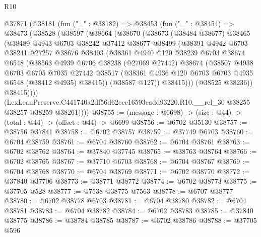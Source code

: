 \begin{lexlean}{R10}
\begin{coremodule}
  @37871
    (@38181
      (fun ("_" : @38182) =>
      @38453
        (fun ("_" : @38454) =>
        @38473
          (@38528
            (@38597
              (@38664
                (@38670
                  (@38673
                    (@38484 @38677)
                    @38465
                    (@38489
                      @4943
                      @6703
                      @38242
                      @37412
                      @38677
                      @38499
                      (@38391
                        @4942
                        @6703
                        @38241
                        @27257
                        @38676
                        @38403
                        (@38361
                          @4940
                          @120
                          @38239
                          @6703
                          @38674
                          @6548
                          (@38563
                            @4939
                            @6706
                            @38238
                            (@27069 @27442)
                            @38674
                            (@38507
                              @4938
                              @6703
                              @6705
                              @7035
                              @27442
                              @38517
                              (@38361 @4936 @120 @6703 @6703 @4935 @6548 (@38412 @4935) @38415))
                            (@38587 @127))
                          @38415)))
                    (@38525 @38236))
                  @38415))))
          (LexLeanPreserve.C441740a2df56d62eec16593cadd93220.R10.__rel_30
            @38255
            @38257
            @38259
            @38261))))
@38755 := (message : @6698) -> (size : @44) -> (total : @44) -> (offset : @44) -> @6699
@38756 := @6702 @35130
@38757 := @38756 @37841
@38758 := @6702 @38757
@38759 := @37749 @6703
@38760 := @6704 @38759
@38761 := @6704 @38760
@38762 := @6704 @38761
@38763 := @6702 @38762
@38764 := @37840 @37745
@38765 := @38763 @38764
@38766 := @6702 @38765
@38767 := @37710 @6703
@38768 := @6704 @38767
@38769 := @6704 @38768
@38770 := @6704 @38769
@38771 := @6702 @38770
@38772 := @37840 @37706
@38773 := @38771 @38772
@38774 := @6702 @38773
@38775 := @37705 @528
@38777 := @7538 @38775 @7563
@38778 := @6707 @38777
@38780 := @6702 @38778 @6703
@38781 := @6704 @38780
@38782 := @6704 @38781
@38783 := @6704 @38782
@38784 := @6702 @38783
@38785 := @37840 @38775
@38786 := @38784 @38785
@38787 := @6702 @38786
@38788 := @37705 @596

\end{coremodule}
\end{lexlean}
